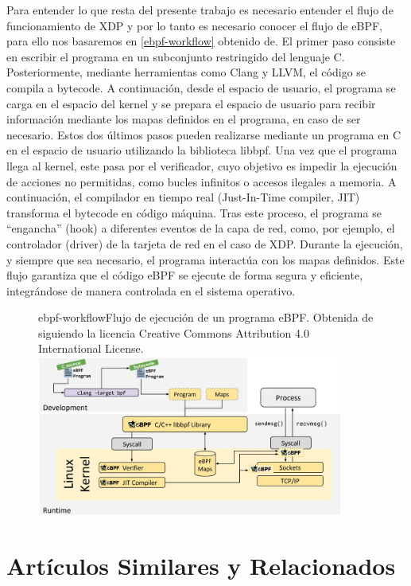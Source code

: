 Para entender lo que resta del presente trabajo es necesario entender el flujo de funcionamiento de XDP y por lo tanto es necesario conocer el flujo de eBPF, para ello nos basaremos en \ref{ebpf-workflow} obtenido de\cite{ebpf_website}. El primer paso consiste en escribir el programa en un subconjunto restringido del lenguaje C. Posteriormente, mediante herramientas como Clang y LLVM, el código se compila a bytecode. A continuación, desde el espacio de usuario, el programa se carga en el espacio del kernel y se prepara el espacio de usuario para recibir información mediante los mapas definidos en el programa, en caso de ser necesario. Estos dos últimos pasos pueden realizarse mediante un programa en C en el espacio de usuario utilizando la biblioteca libbpf. Una vez que el programa llega al kernel, este pasa por el verificador, cuyo objetivo es impedir la ejecución de acciones no permitidas, como bucles infinitos o accesos ilegales a memoria. A continuación, el compilador en tiempo real (Just-In-Time compiler, JIT) transforma el bytecode en código máquina. Tras este proceso, el programa se “engancha” (hook) a diferentes eventos de la capa de red, como, por ejemplo, el controlador (driver) de la tarjeta de red en el caso de XDP. Durante la ejecución, y siempre que sea necesario, el programa interactúa con los mapas definidos. Este flujo garantiza que el código eBPF se ejecute de forma segura y eficiente, integrándose de manera controlada en el sistema operativo.

\begin{figure}[Flujo eBPF]{ebpf-workflow}{Flujo de ejecución de un programa eBPF. Obtenida de\cite{ebpf_website} siguiendo la licencia Creative Commons Attribution 4.0 International License.}
	\includegraphics[width=0.9\textwidth]{capturas/eBPF_workflow.png}
\end{figure}

\section{Artículos Similares y Relacionados}
